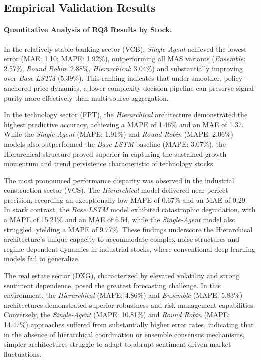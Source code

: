 \documentclass{ieeeaccess}
\begin{document}
\subsection{Empirical Validation Results}

\paragraph{Quantitative Analysis of RQ3 Results by Stock.}

In the relatively stable banking sector (VCB), \textit{Single-Agent} achieved the lowest error (MAE: 1.10; MAPE: 1.92\%), outperforming all MAS variants (\textit{Ensemble}: 2.57\%, \textit{Round Robin}: 2.88\%, \textit{Hierarchical}: 3.04\%) and substantially improving over \textit{Base LSTM} (5.39\%). This ranking indicates that under smoother, policy-anchored price dynamics, a lower-complexity decision pipeline can preserve signal purity more effectively than multi-source aggregation.


In the technology sector (FPT), the \textit{Hierarchical} architecture demonstrated the highest predictive accuracy, achieving a MAPE of 1.46\% and an MAE of 1.37. While the \textit{Single-Agent} (MAPE: 1.91\%) and \textit{Round Robin} (MAPE: 2.06\%) models also outperformed the \textit{Base LSTM} baseline (MAPE: 3.07\%), the Hierarchical structure proved superior in capturing the sustained growth momentum and trend persistence characteristic of technology stocks.


The most pronounced performance disparity was observed in the industrial construction sector (VCS). The \textit{Hierarchical} model delivered near-perfect precision, recording an exceptionally low MAPE of 0.67\% and an MAE of 0.29. In stark contrast, the \textit{Base LSTM} model exhibited catastrophic degradation, with a MAPE of 15.21\% and an MAE of 6.54, while the \textit{Single-Agent} model also struggled, yielding a MAPE of 9.77\%. These findings underscore the Hierarchical architecture’s unique capacity to accommodate complex noise structures and regime-dependent dynamics in industrial stocks, where conventional deep learning models fail to generalize.


The real estate sector (DXG), characterized by elevated volatility and strong sentiment dependence, posed the greatest forecasting challenge. In this environment, the \textit{Hierarchical} (MAPE: 4.86\%) and \textit{Ensemble} (MAPE: 5.83\%) architectures demonstrated superior robustness and risk management capabilities. Conversely, the \textit{Single-Agent} (MAPE: 10.81\%) and \textit{Round Robin} (MAPE: 14.47\%) approaches suffered from substantially higher error rates, indicating that in the absence of hierarchical coordination or ensemble consensus mechanisms, simpler architectures struggle to adapt to abrupt sentiment-driven market fluctuations.
\end{document}

